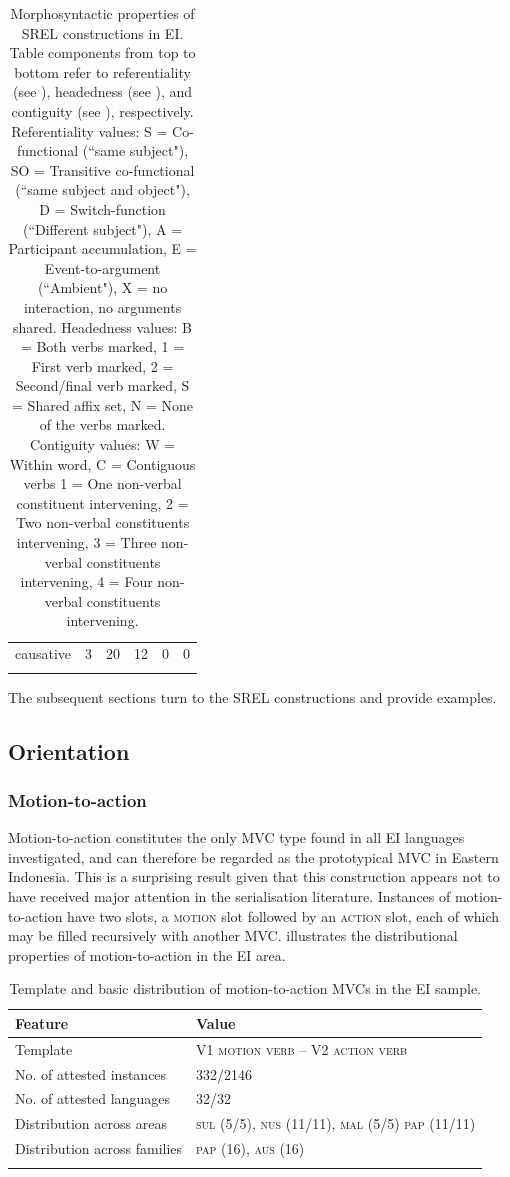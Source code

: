 \begin{table}
\begin{tabular}{rrrrrr}
  causative &   3 &  20 &  12 &   0 &   0 \\ 
   \lspbottomrule
\end{tabular}
\caption[Morphosyntactic properties of SREL constructions]{Morphosyntactic properties of SREL constructions in EI. Table components from top to bottom refer to referentiality (see ), headedness (see ), and contiguity (see ), respectively. Referentiality values: S = Co-functional (``same subject"), SO = Transitive co-functional (``same subject and object"), D = Switch-function (``Different subject"), A = Participant accumulation, E = Event-to-argument (``Ambient"), X = no interaction, no arguments shared. Headedness values: B = Both verbs marked, 1 = First verb marked, 2 = Second/final verb marked, S = Shared affix set, N = None of the verbs marked. Contiguity values: W = Within word, C = Contiguous verbs 1 = One non-verbal constituent intervening, 2 = Two non-verbal constituents intervening, 3 = Three non-verbal constituents intervening, 4 = Four non-verbal constituents intervening.}
\label{table:SREL_formal}
\end{table}

The subsequent sections turn to the SREL constructions and provide examples.

\subsection{Orientation} \label{sec:orientation}
\subsubsection{Motion-to-action} \label{sec:motion-to-action}

Motion-to-action constitutes the only MVC type found in all EI languages investigated, and can therefore be regarded as the prototypical MVC in Eastern Indonesia. This is a surprising result given that this construction appears not to have received major attention in the serialisation literature. Instances of motion-to-action have two slots, a \textsc{motion} slot followed by an \textsc{action} slot, each of which may be filled recursively with another MVC.  illustrates the distributional properties of motion-to-action in the EI area.

\begin{table}
\begin{tabular}{ll}
\lsptoprule
Feature&Value\tabularnewline
\midrule
Template&V1 \textsc{motion verb} -- V2 \textsc{action verb}\tabularnewline
No. of attested instances& 332/2146 \tabularnewline
No. of attested languages& 32/32 \tabularnewline
Distribution across areas& \textsc{sul} (5/5), \textsc{nus} (11/11), \textsc{mal} (5/5) \textsc{pap} (11/11) \tabularnewline
Distribution across families& \textsc{pap} (16), \textsc{aus} (16) \tabularnewline
\lspbottomrule
\end{tabular}
\caption[Template and basic distribution of motion-to-action MVCs]{Template and basic distribution of motion-to-action MVCs in the EI sample.}
\label{table:motion-to-action}
\end{table}

